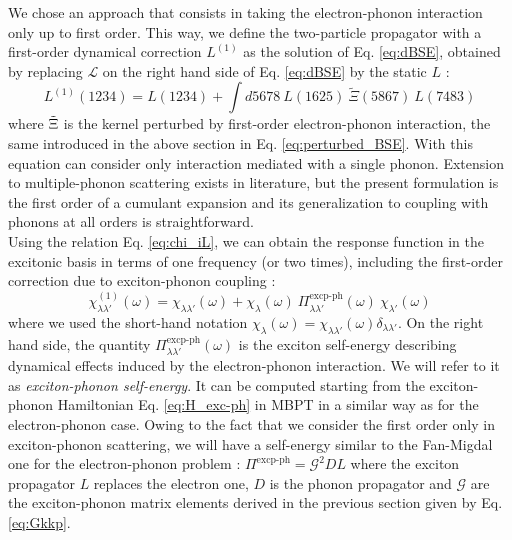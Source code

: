 We chose an approach that consists in taking the electron-phonon interaction only up to first order. This way, we define the two-particle propagator with a first-order dynamical correction $L^{(1)}$ as the solution of Eq. \eqref{eq:dBSE}, obtained by replacing $\mathcal{L}$ on the right hand side of Eq. \ref{eq:dBSE} by the static $L$ :
\begin{equation}
    L^{(1)}(1234) = L(1234) + \int d5678 \ L(1625) \ \tilde{\Xi}(5867) \ L(7483)
\end{equation}
where $\Tilde{\Xi}$ is the kernel perturbed by first-order electron-phonon interaction, the same introduced in the above section in Eq. \eqref{eq:perturbed_BSE}. With this equation can consider only interaction mediated with a single phonon. Extension to multiple-phonon scattering exists in literature,\cite{perebeinos2008phonon} but the present formulation is the first order of a cumulant expansion and its generalization to coupling with phonons at all orders is straightforward.\cite{cudazzo2020first}\\
Using the relation Eq. \eqref{eq:chi_iL}, we can obtain the response function in the excitonic basis in terms of one frequency (or two times), including the first-order correction due to exciton-phonon coupling :
\begin{equation}
    \chi^{(1)}_{\lambda\lambda'}(\omega) = \chi_{\lambda\lambda'}(\omega) + \chi_{\lambda}(\omega) \ \Pi^{\text{excp-ph}}_{\lambda\lambda'} (\omega) \ \chi_{\lambda'}(\omega) \label{eq:chi_1}
\end{equation}
where we used the short-hand notation $\chi_{\lambda}(\omega) = \chi_{\lambda\lambda'} (\omega) \delta_{\lambda\lambda'}$. On the right hand side, the quantity $\Pi^{\text{excp-ph}}_{\lambda\lambda'} (\omega)$ is the exciton self-energy describing dynamical effects induced by the electron-phonon interaction. We will refer to it as \textit{exciton-phonon self-energy}. It can be computed starting from the exciton-phonon Hamiltonian Eq. \ref{eq:H_exc-ph} in \acrshort{MBPT}\cite{mahan2000many} in a similar way as for the electron-phonon case.\cite{giustino2017review} Owing to the fact that we consider the first order only in exciton-phonon scattering, we will have a self-energy similar to the Fan-Migdal one for the electron-phonon problem : $\Pi^{\text{excp-ph}} = \mathcal{G}^2DL$ where the exciton propagator $L$ replaces the electron one, $D$ is the phonon propagator and $\mathcal{G}$ are the exciton-phonon matrix elements derived in the previous section given by Eq. \eqref{eq:Gkkp}. 

